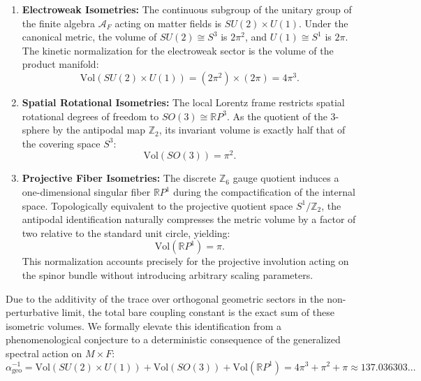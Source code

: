 \documentclass[12pt,a4paper]{article}
\begin{document}
\begin{enumerate}
    \item \textbf{Electroweak Isometries:} The continuous subgroup of the unitary group of the finite algebra $\mathcal{A}_F$ acting on matter fields is $SU(2) \times U(1)$. Under the canonical metric, the volume of $SU(2) \cong S^3$ is $2\pi^2$, and $U(1) \cong S^1$ is $2\pi$. The kinetic normalization for the electroweak sector is the volume of the product manifold:
    \begin{equation}
    \text{Vol}(SU(2) \times U(1)) = (2\pi^2) \times (2\pi) = 4\pi^3.
    \end{equation}
    
    \item \textbf{Spatial Rotational Isometries:} The local Lorentz frame restricts spatial rotational degrees of freedom to $SO(3) \cong \mathbb{R}P^3$. As the quotient of the 3-sphere by the antipodal map $\mathbb{Z}_2$, its invariant volume is exactly half that of the covering space $S^3$:
    \begin{equation}
    \text{Vol}(SO(3)) = \pi^2.
    \end{equation}
    
    \item \textbf{Projective Fiber Isometries:} The discrete $\mathbb{Z}_6$ gauge quotient induces a one-dimensional singular fiber $\mathbb{R}P^1$ during the compactification of the internal space. Topologically equivalent to the projective quotient space $S^1/\mathbb{Z}_2$, the antipodal identification naturally compresses the metric volume by a factor of two relative to the standard unit circle, yielding:
    \begin{equation}
    \text{Vol}(\mathbb{R}P^1) = \pi.
    \end{equation}
    This normalization accounts precisely for the projective involution acting on the spinor bundle without introducing arbitrary scaling parameters.
\end{enumerate}

Due to the additivity of the trace over orthogonal geometric sectors in the non-perturbative limit, the total bare coupling constant is the exact sum of these isometric volumes. We formally elevate this identification from a phenomenological conjecture to a deterministic consequence of the generalized spectral action on $M \times F$:
\begin{equation}
\boxed{\alpha^{-1}_{\text{geo}} = \text{Vol}(SU(2) \times U(1)) + \text{Vol}(SO(3)) + \text{Vol}(\mathbb{R}P^1) = 4\pi^3 + \pi^2 + \pi \approx 137.036303\dots}
\end{equation}
\end{document}
